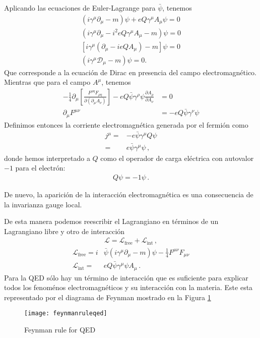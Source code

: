 \begin{frame}
Aplicando las ecuaciones de Euler-Lagrange para $\bar{\psi}$, tenemos
\begin{align}
  (i\gamma^\mu\partial_\mu-m)\psi+eQ\gamma^\mu A_\mu\psi=0\nonumber\\
  (i\gamma^\mu\partial_\mu-i^2eQ\gamma^\mu A_\mu-m)\psi=0\nonumber\\
  [i\gamma^\mu(\partial_\mu-ieQA_\mu)-m]\psi=0\nonumber\\
  (i\gamma^\mu\mathcal{D}_\mu-m)\psi=0.
\end{align}
Que corresponde a la ecuación de Dirac en presencia del campo electromagnético. Mientras que para el campo $A^\mu$, tenemos
\begin{align}
  -\frac{1}{4}\partial_\mu\left[\frac{F^{\rho\eta}F_{\rho\eta}}{\partial\left(\partial_\mu A_\nu\right)}\right]-eQ\bar{\psi}\gamma^\rho\psi\frac{\partial A_\rho}{\partial A_\nu}&=0\nonumber\\
  \partial_\mu F^{\mu\nu}&=-eQ\bar{\psi}\gamma^\nu\psi
\end{align}
Definimos entonces la corriente electromagnética generada por el fermión como
\begin{align}
  \label{eq:222qft}
  j^\mu=&-e\bar{\psi}\gamma^\mu Q\psi \nonumber\\
       =&e\bar{\psi}\gamma^\mu\psi \,,
\end{align}
donde hemos interpretado a $Q$ como el operador de carga eléctrica con autovalor $-1$ para el electrón:
\begin{align}
  Q\psi =-1\psi\,.
\end{align}

De nuevo, la aparición de la interacción electromagnética es una consecuencia de la invarianza gauge local. 
\end{frame}

\begin{frame}
De esta manera podemos reescribir el Lagrangiano en términos de un Lagrangiano libre y otro de interacción
\begin{align}
  \mathcal{L}=\mathcal{L}_{\text{free}}+\mathcal{L}_{\text{int}}\,,
\end{align}
\begin{align}
  \mathcal{L}_{\text{free}}=i&\bar{\psi}\left(i\gamma^\mu\partial_\mu-m\right)\psi-\tfrac{1}{4}F^{\mu\nu}F_{\mu\nu}\nonumber\\
  \mathcal{L}_{\text{int}}=&eQ\bar{\psi}\gamma^\mu\psi A_\mu\,.
\end{align}
Para la QED sólo hay un término de interacción que es suficiente para explicar todos los fenoménos electromagnéticos y su interacción con la materia. Este esta representado por el diagrama de Feynman mostrado en la Figura \ref{fig:feynmanruleqed}

\end{frame}
\begin{frame}
\begin{figure}
  \centering
  \texttt{[image: feynmanruleqed]} %
  \caption{Feynman rule for QED}
  \label{fig:feynmanruleqed}
\end{figure}
\end{frame}


